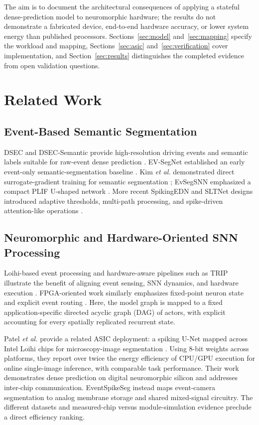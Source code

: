 \documentclass[preprint,12pt,number]{elsarticle}
\begin{document}
The aim is to document the architectural consequences of applying a stateful dense-prediction model to neuromorphic hardware; the results do not demonstrate a fabricated device, end-to-end hardware accuracy, or lower system energy than published processors. Sections~\ref{sec:model} and~\ref{sec:mapping} specify the workload and mapping, Sections~\ref{sec:asic} and~\ref{sec:verification} cover implementation, and Section~\ref{sec:results} distinguishes the completed evidence from open validation questions.

\section{Related Work}
\subsection{Event-Based Semantic Segmentation}
DSEC and DSEC-Semantic provide high-resolution driving events and semantic labels suitable for raw-event dense prediction \cite{gehrig2021dsec,sun2022ess}. EV-SegNet established an early event-only semantic-segmentation baseline \cite{alonso2019evsegnet}. Kim \emph{et al.} demonstrated direct surrogate-gradient training for semantic segmentation \cite{kim2022beyond}; EvSegSNN emphasized a compact PLIF U-shaped network \cite{hareb2024evsegsnn}. More recent SpikingEDN and SLTNet designs introduced adaptive thresholds, multi-path processing, and spike-driven attention-like operations \cite{zhang2024spikingedn,long2025sltnet}.

\subsection{Neuromorphic and Hardware-Oriented SNN Processing}
Loihi-based event processing and hardware-aware pipelines such as TRIP illustrate the benefit of aligning event sensing, SNN dynamics, and hardware execution \cite{renner2019attention,arjmand2024trip}. FPGA-oriented work similarly emphasizes fixed-point neuron state and explicit event routing \cite{courtois2024embedded}. Here, the model graph is mapped to a fixed application-specific directed acyclic graph (DAG) of actors, with explicit accounting for every spatially replicated recurrent state.

Patel \emph{et al.} provide a related ASIC deployment: a spiking U-Net mapped across Intel Loihi chips for microscopy-image segmentation \cite{patel2021segmentation}. Using 8-bit weights across platforms, they report over twice the energy efficiency of CPU/GPU execution for online single-image inference, with comparable task performance. Their work demonstrates dense prediction on digital neuromorphic silicon and addresses inter-chip communication. EventSpikeSeg instead maps event-camera segmentation to analog membrane storage and shared mixed-signal circuitry. The different datasets and measured-chip versus module-simulation evidence preclude a direct efficiency ranking.
\end{document}
